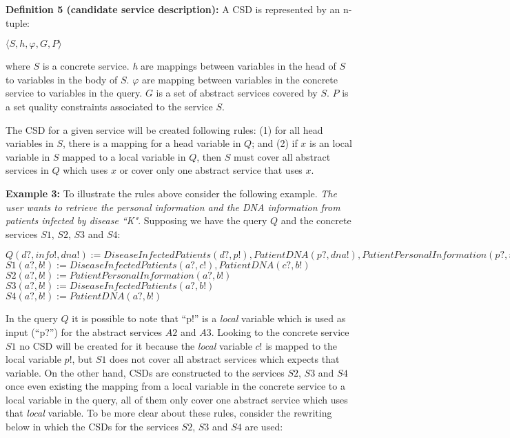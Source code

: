 \noindent \textbf{Definition 5 (candidate service description):} A CSD is represented by an n-tuple: %
\begin{center}
$\langle S, h, \varphi, G, P\rangle$
\end{center}
where $S$ is a concrete service. 
\textit{h} are mappings between variables in the head of $S$ to variables in the body of $S$. 
$\varphi$ are mapping between variables in the concrete service to variables in the query.
$G$ is a set of abstract services covered by $S$. 
$P$ is a set quality constraints associated to the service $S$. 

The CSD for a given service will be created following rules: (1) for all head variables in $S$, there is a mapping for a head variable in $Q$; and (2) if $x$ is an local variable in $S$ mapped to a local variable in $Q$, then $S$ must cover all abstract services in $Q$ which uses $x$ or cover only one abstract service that uses $x$.

\noindent \textbf{Example 3:} To illustrate the rules above consider the following example. 
\textit{The user wants to retrieve the personal information and the DNA information from patients infected by disease ``K"}.
Supposing we have the query $Q$ and the concrete services $S1$, $S2$, $S3$ and $S4$:

\begin{center}
$Q (d?, info!, dna!) := DiseaseInfectedPatients(d?, p!), PatientDNA(p?, dna!), PatientPersonalInformation(p?, info!)$ \\
$S1 (a?, b!) := DiseaseInfectedPatients(a?, c!), PatientDNA(c?, b!)$ \\
$S2 (a?, b!) := PatientPersonalInformation(a?, b!)$ \\
$S3 (a?, b!) := DiseaseInfectedPatients(a?, b!)$ \\
$S4 (a?, b!) := PatientDNA(a?, b!)$ \\
\end{center} 

In the query $Q$ it is possible to note that ``p!'' is a \textit{local} variable which is used as input (``p?'') for the abstract services $A2$ and $A3$. 
Looking to the concrete service $S1$ no CSD will be created for it because the \textit{local} variable $c!$ is mapped to the local variable $p!$, but $S1$ does not cover all abstract services which expects that variable. 
On the other hand, CSDs are constructed to the services $S2$, $S3$ and $S4$ once even existing the mapping from a local variable in the concrete service to a local variable in the query, all of them only cover one abstract service which uses that \textit{local} variable.
To be more clear about these rules, consider the rewriting below in which the CSDs for the services  $S2$, $S3$ and $S4$ are used:

